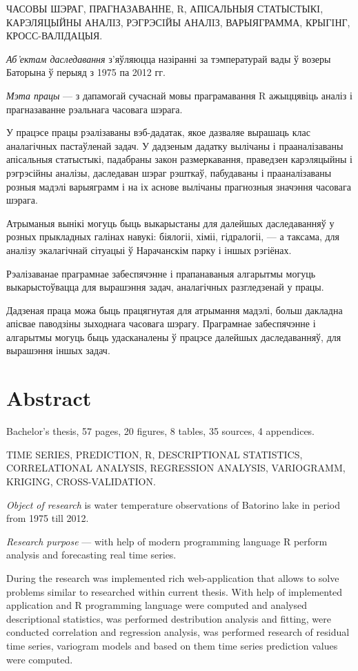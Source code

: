 \documentclass[a4paper,14pt]{extreport}
\begin{document}
ЧАСОВЫ ШЭРАГ, ПРАГНАЗАВАННЕ, R, АПІСАЛЬНЫЯ СТАТЫСТЫКI, КАРЭЛЯЦЫЙНЫ АНАЛIЗ, РЭГРЭСIЙЫ АНАЛIЗ, ВАРЫЯГРАММА, КРЫГIНГ, КРОСС-ВАЛIДАЦЫЯ\@.

\textit{Аб'ектам даследавання} з'яўляюцца назіранні за тэмпературай вады ў возеры Баторына ў перыяд з 1975 па 2012 гг.

\textit{Мэта працы} --- з дапамогай сучаснай мовы праграмавання R ажыццявіць аналіз і прагназаванне рэальнага часовага шэрага.

У працэсе працы рэалізаваны вэб-дадатак, якое дазваляе вырашаць клас аналагічных пастаўленай задач. У дадзеным дадатку вылічаны і прааналізаваны апісальныя статыстыкі, падабраны закон размеркавання, праведзен карэляцыйны і рэгрэсійны аналізы, даследаван шэраг рэшткаў, пабудаваны і прааналізаваны розныя мадэлі варыяграмм і на іх аснове вылічаны прагнозныя значэння часовага шэрага.

Атрыманыя вынікі могуць быць выкарыстаны для далейшых даследаванняў у розных прыкладных галінах навукі: біялогіі, хіміі, гідралогіі, --- а таксама, для аналізу экалагічнай сітуацыі ў Нарачанскім парку і іншых рэгіёнах.

Рэалізаванае праграмнае забеспячэнне і прапанаваныя алгарытмы могуць выкарыстоўвацца для вырашэння задач, аналагічных разгледзенай у працы.

Дадзеная праца можа быць працягнутая для атрымання мадэлі, больш дакладна апісвае паводзіны зыходнага часовага шэрагу. Праграмнае забеспячэнне і алгарытмы могуць быць удасканалены ў працэсе далейшых даследаванняў, для вырашэння іншых задач.

\newpage

\chapter*{Abstract}
Bachelor's thesis, 57 pages, 20 figures, 8 tables, 35 sources, 4 appendices.

TIME SERIES, PREDICTION, R, DESCRIPTIONAL STATISTICS, CORRELATIONAL ANALYSIS, REGRESSION ANALYSIS, VARIOGRAMM, KRIGING, CROSS-VALIDATION\@.

\textit{Object of research} is water temperature observations of Batorino lake in period from 1975 till 2012.

\textit{Research purpose} --- with help of modern programming language R perform analysis and forecasting real time series.

During the research was implemented rich web-application that allows to solve problems similar to researched within current thesis. With help of implemented application and R programming language were computed and analysed descriptional statistics, was performed destribution analysis and fitting, were conducted correlation and regression analysis, was performed research of residual time series, variogram models and based on them time series prediction values were computed.
\end{document}
